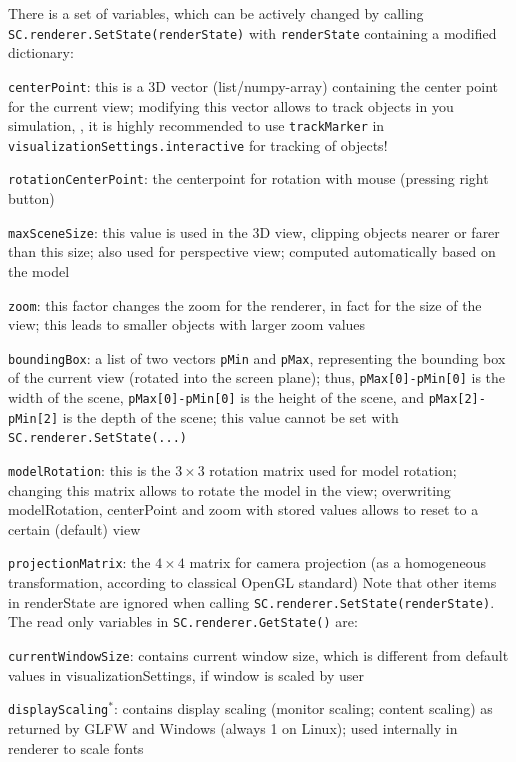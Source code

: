 There is a set of variables, which can be actively changed by calling  \texttt{SC.renderer.SetState(renderState)} with \texttt{renderState}
containing a modified dictionary:
\bi
  \item \texttt{centerPoint}: this is a 3D vector (list/numpy-array) containing the center point for the current view; modifying this vector allows to track objects in you simulation, , it is highly recommended to use \texttt{trackMarker} in \texttt{visualizationSettings.interactive} for tracking of objects!
  \item \texttt{rotationCenterPoint}: the centerpoint for rotation with mouse (pressing right button)
  \item \texttt{maxSceneSize}: this value is used in the 3D view, clipping objects nearer or farer than this size; also used for perspective view; computed automatically based on the model
  \item \texttt{zoom}: this factor changes the zoom for the renderer, in fact for the size of the view; this leads to smaller objects with larger zoom values
  \item \texttt{boundingBox}: a list of two vectors \texttt{pMin} and \texttt{pMax}, representing the bounding box of the current view (rotated into the screen plane); thus, \texttt{pMax[0]-pMin[0]} is the width of the scene, \texttt{pMax[0]-pMin[0]} is the height of the scene, and \texttt{pMax[2]-pMin[2]} is the depth of the scene; this value cannot be set with \texttt{SC.renderer.SetState(...)}
  \item \texttt{modelRotation}: this is the $3 \times 3$ rotation matrix used for model rotation; changing this matrix allows to rotate the model in the view; overwriting modelRotation, centerPoint and zoom with stored values allows to reset to a certain (default) view
  \item \texttt{projectionMatrix}: the $4 \times 4$ matrix for camera projection (as a homogeneous transformation, according to classical OpenGL standard)
\ei
Note that other items in renderState are ignored when calling \texttt{SC.renderer.SetState(renderState)}. The read only variables in \texttt{SC.renderer.GetState()} are:
\bi
  \item \texttt{currentWindowSize}: contains current window size, which is different from default values in visualizationSettings, if window is scaled by user
  \item \texttt{displayScaling}$^*$: contains display scaling (monitor scaling; content scaling) as returned by GLFW and Windows (always 1 on Linux); used internally in renderer to scale fonts

